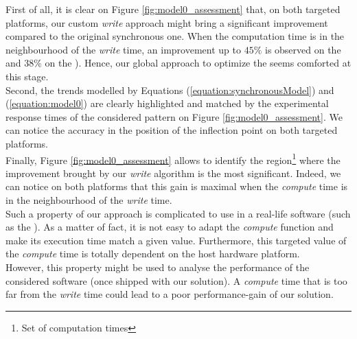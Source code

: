 		First of all, it is clear on Figure \ref{fig:model0_assessment} that, on both targeted platforms, our custom \notationaio\space \emph{write} approach might bring a significant improvement compared to the original synchronous one.   When the computation time is in the neighbourhood of the \emph{write} time, an improvement up to $45\%$ is observed on the \targetPlatformLaptop\space and $38\%$ on the \targetPlatformHpc).   Hence, our global approach to optimize the \toolTargetSoftware\space seems comforted at this stage.\\
		Second, the trends modelled by Equations (\ref{equation:synchronousModel}) and (\ref{equation:model0}) are clearly highlighted and matched by the experimental response times of the considered pattern on Figure \ref{fig:model0_assessment}.   We can notice the accuracy in the position of the inflection point on both targeted platforms.\\

		Finally, Figure \ref{fig:model0_assessment} allows to identify the region\footnote{Set of computation times} where the improvement brought by our \notationaio\space \emph{write} algorithm is the most significant.   Indeed, we can notice on both platforms that this gain is maximal when the \emph{compute} time is in the neighbourhood of the \emph{write} time.\\

		Such a property of our \notationaio\space approach is complicated to use in a real-life software (such as the \toolTargetSoftware).   As a matter of fact, it is not easy to adapt the \emph{compute} function and make its execution time match a given value.   Furthermore, this targeted value of the \emph{compute} time is totally dependent on the host hardware platform.\\
		However, this property might be used to analyse the performance of the considered software (once shipped with our solution).   A \emph{compute} time that is too far from the \emph{write} time could lead to a poor performance-gain of our solution.


